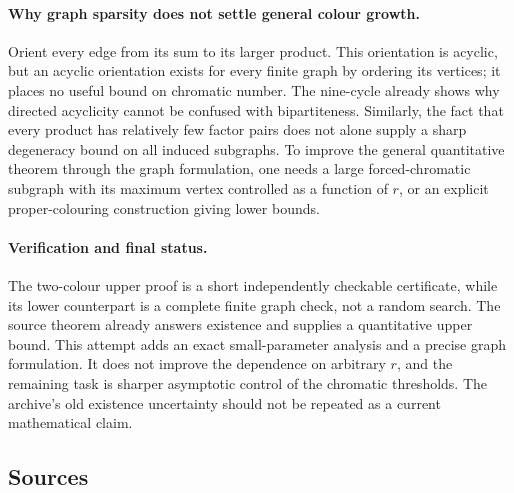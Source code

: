 \documentclass[11pt,a4paper]{article}
\begin{document}
\paragraph{Why graph sparsity does not settle general colour growth.}
Orient every edge from its sum to its larger product. This orientation is acyclic, but an acyclic orientation exists for every finite graph by ordering its vertices; it places no useful bound on chromatic number. The nine-cycle already shows why directed acyclicity cannot be confused with bipartiteness. Similarly, the fact that every product has relatively few factor pairs does not alone supply a sharp degeneracy bound on all induced subgraphs. To improve the general quantitative theorem through the graph formulation, one needs a large forced-chromatic subgraph with its maximum vertex controlled as a function of $r$, or an explicit proper-colouring construction giving lower bounds.

\paragraph{Verification and final status.}
The two-colour upper proof is a short independently checkable certificate, while its lower counterpart is a complete finite graph check, not a random search. The source theorem already answers existence and supplies a quantitative upper bound. This attempt adds an exact small-parameter analysis and a precise graph formulation. It does not improve the dependence on arbitrary $r$, and the remaining task is sharper asymptotic control of the chromatic thresholds. The archive's old existence uncertainty should not be repeated as a current mathematical claim.

\subsection{Sources}
\end{document}
